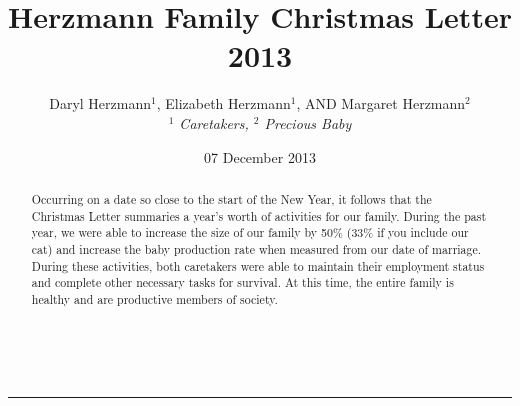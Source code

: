 \documentclass{article}
\title{Herzmann Family Christmas Letter 2013}
\author{Daryl Herzmann${}^1$, Elizabeth Herzmann${}^1$, AND Margaret Herzmann${}^2$ \\
\it{${}^1$ Caretakers},
\it{${}^2$ Precious Baby}}
\date{07 December 2013}
\newcommand{\Line}[0]{%
  \rule{0cm}{0cm}\\\hrule\rule{0cm}{0cm}%
}
\begin{document}
\maketitle

\begin{abstract}
Occurring on a date so close to the start of the New Year, it follows that
the Christmas Letter summaries a year's worth of activities for our family.
During the past year, we were able to increase the size of our family by
50\% (33\% if you include our cat) and increase the baby production rate
when measured from our date of marriage.  During these activities, both
caretakers were able to maintain their employment status and complete other
necessary tasks for survival.  At this time, the entire family is healthy
and are productive members of society.

\end{abstract}

\Line
\end{document}
